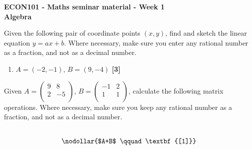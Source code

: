 \documentclass[a4paper, leqno, 12pt]{article}
\newenvironment{top_enumerate}{
\begin{enumerate}
  \setlength{\itemsep}{2em}
  \setlength{\topsep}{-0pt}
  \setlength{\partopsep}{-0pt}
}{\end{enumerate}}
\newlength{\EqL}
\newlength{\RunL}
\newcommand{\EqContent}{foo}
\begin{document}
\singlespacing
\begin{center}
\textbf{
ECON101 - Maths seminar material - Week 1\\
\bigskip
Algebra
}
\end{center}
\bigskip

\begin{top_enumerate}

\item Given the following pair of coordinate points $(x,y)$, find and sketch the linear equation $y = ax + b$. Where necessary, make sure you enter any rational number as a fraction, and not as a decimal number.
 
\setcounter{equation}{0}  %
\begin{enumerate}
	\setlength{\topsep}{-0pt}
	\setlength{\partopsep}{-0pt}
	\setlength{\itemsep}{10pt}
			\item $A= ({-2},{-1}),\, B= ({9},{-4})$
	 \quad \textbf{[3]}
\end{enumerate}\item Given \(A=\left( {\begin{array}{cc}
   {9} & {8} \\
   {2} & {-5} \\
 \end{array} } \right) \), \(B=\left( {\begin{array}{cc}
     {-1} & {2} \\
     {1} & {1} \\
    \end{array} } \right) \), calculate the following matrix operations. Where necessary, make sure you keep any rational number as a fraction, and not as a decimal number.
 \\ 
\setcounter{equation}{0}  %
\setlength{\RunL}{0pt}
	\renewcommand{\EqContent}{\nodollar{$A+B$
	\qquad\textbf{[1]}}}
	\settowidth{\EqL}{$\qquad\EqContent\qquad$}
	\setlength{\RunL}{\RunL+\EqL}
		{\setlength{\RunL}{0pt}
		\\}
		{}
	\begin{minipage}{\EqL}
	\begin{equation}
	\EqContent
	\end{equation}
	\end{minipage}
	\renewcommand{\EqContent}{\nodollar{${2}A-{3}B$
	\qquad\textbf{[1]}}}
	\settowidth{\EqL}{$\qquad\EqContent\qquad$}
	\setlength{\RunL}{\RunL+\EqL}
		{\setlength{\RunL}{0pt}
		\\}

\end{top_enumerate}
\end{document}
